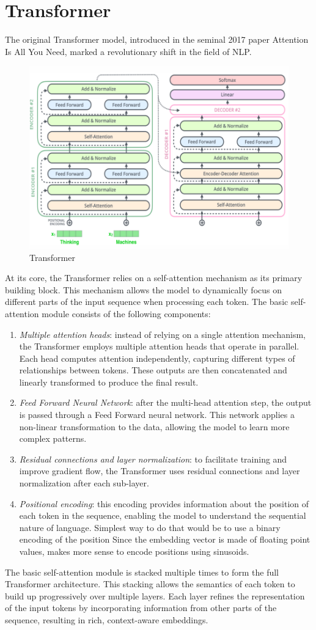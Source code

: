 \section{Transformer}
The original Transformer model, introduced in the seminal 2017 paper Attention Is All You Need, marked a revolutionary shift in the field of NLP. 

\begin{figure}[H]
    \centering
    \includegraphics[width=0.5\linewidth]{images/nlp6.png}
    \caption{Transformer}
\end{figure}
At its core, the Transformer relies on a self-attention mechanism as its primary building block. 
This mechanism allows the model to dynamically focus on different parts of the input sequence when processing each token. 
The basic self-attention module consists of the following components:
\begin{enumerate}
    \item \textit{Multiple attention heads}: instead of relying on a single attention mechanism, the Transformer employs multiple attention heads that operate in parallel. 
        Each head computes attention independently, capturing different types of relationships between tokens. 
        These outputs are then concatenated and linearly transformed to produce the final result.
    \item \textit{Feed Forward Neural Network}: after the multi-head attention step, the output is passed through a Feed Forward neural network. 
        This network applies a non-linear transformation to the data, allowing the model to learn more complex patterns.
    \item \textit{Residual connections and layer normalization}: to facilitate training and improve gradient flow, the Transformer uses residual connections and layer normalization after each sub-layer. 
    \item \textit{Positional encoding}: this encoding provides information about the position of each token in the sequence, enabling the model to understand the sequential nature of language.
        Simplest way to do that would be to use a binary encoding of the position
        Since the embedding vector is made of floating point values, makes more sense to encode positions using sinusoids.
\end{enumerate}
\noindent The basic self-attention module is stacked multiple times to form the full Transformer architecture. This stacking allows the semantics of each token to build up progressively over multiple layers.
Each layer refines the representation of the input tokens by incorporating information from other parts of the sequence, resulting in rich, context-aware embeddings.

